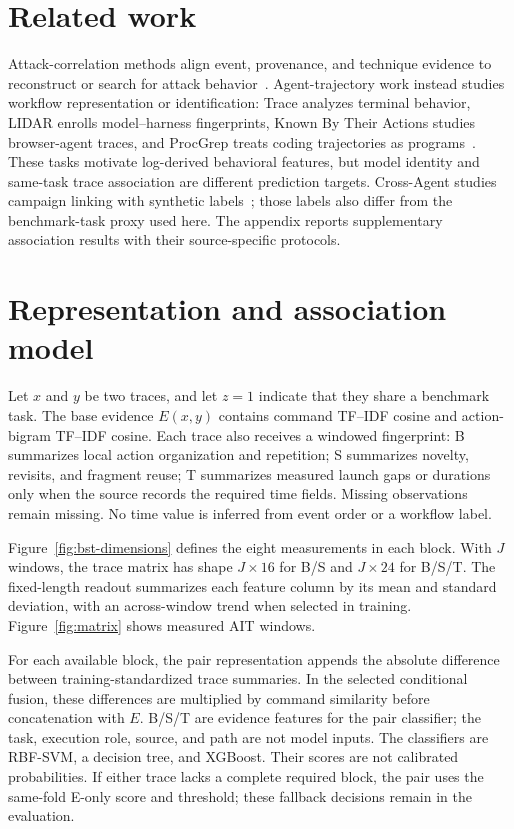 \documentclass[10pt]{article}
\begin{document}
\FloatBarrier
\section{Related work}
Attack-correlation methods align event, provenance, and technique evidence to reconstruct or search for attack behavior~\cite{holmes,poirot,atlas,ostinato,sfm}. Agent-trajectory work instead studies workflow representation or identification: Trace analyzes terminal behavior, LIDAR enrolls model--harness fingerprints, Known By Their Actions studies browser-agent traces, and ProcGrep treats coding trajectories as programs~\cite{trace,lidar,known,procgrep}. These tasks motivate log-derived behavioral features, but model identity and same-task trace association are different prediction targets. Cross-Agent studies campaign linking with synthetic labels~\cite{crossagent}; those labels also differ from the benchmark-task proxy used here. The appendix reports supplementary association results with their source-specific protocols.

\section{Representation and association model}
Let $x$ and $y$ be two traces, and let $z=1$ indicate that they share a benchmark task. The base evidence $E(x,y)$ contains command TF--IDF cosine and action-bigram TF--IDF cosine. Each trace also receives a windowed fingerprint: B summarizes local action organization and repetition; S summarizes novelty, revisits, and fragment reuse; T summarizes measured launch gaps or durations only when the source records the required time fields. Missing observations remain missing. No time value is inferred from event order or a workflow label.

Figure~\ref{fig:bst-dimensions} defines the eight measurements in each block. With $J$ windows, the trace matrix has shape $J\times16$ for B/S and $J\times24$ for B/S/T. The fixed-length readout summarizes each feature column by its mean and standard deviation, with an across-window trend when selected in training. Figure~\ref{fig:matrix} shows measured AIT windows.

For each available block, the pair representation appends the absolute difference between training-standardized trace summaries. In the selected conditional fusion, these differences are multiplied by command similarity before concatenation with $E$. B/S/T are evidence features for the pair classifier; the task, execution role, source, and path are not model inputs. The classifiers are RBF-SVM, a decision tree, and XGBoost. Their scores are not calibrated probabilities. If either trace lacks a complete required block, the pair uses the same-fold E-only score and threshold; these fallback decisions remain in the evaluation.
\end{document}

